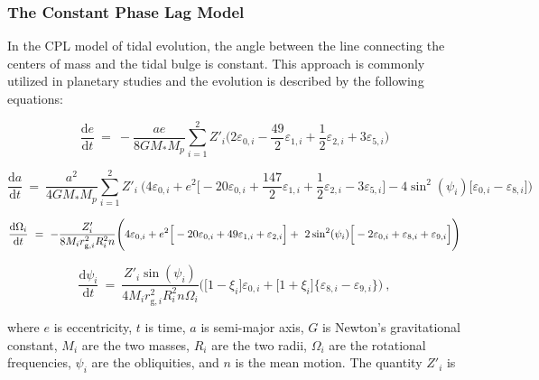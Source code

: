 \documentclass[preprint,12pt]{aastex}
\begin{document}
\subsubsection{The Constant Phase Lag Model}

In the CPL model of tidal evolution, the angle between the line connecting the
centers of mass and the tidal bulge is constant. This approach is commonly
utilized in planetary studies \citep[e.g.][]{GoldreichSoter66,Greenberg09} and the
evolution is described by the following equations:

\begin{equation}\label{eq:e_cpl}
  \frac{\mathrm{d}e}{\mathrm{d}t} \ = \ - \frac{ae}{8 G M_* M_p}
  \sum\limits_{i = 1}^2Z'_i \Bigg(2\varepsilon_{0,i} - \frac{49}{2}\varepsilon_{1,i} + \frac{1}{2}\varepsilon_{2,i} + 3\varepsilon_{5,i}\Bigg)
\end{equation}

\begin{equation}\label{eq:a_cpl}
  \frac{\mathrm{d}a}{\mathrm{d}t} \ = \ \frac{a^2}{4 G M_* M_p}
  \sum\limits_{i = 1}^2 Z'_i  \ {\Bigg(} 4\varepsilon_{0,i} + e^2{\Big [} -20\varepsilon_{0,i} + \frac{1
47}{2}\varepsilon_{1,i} + \nonumber \frac{1}{2}\varepsilon_{2,i} - 3\varepsilon_{5,i} {\Big ]} -4\sin^2(\psi_i){\Big [}\varepsilon_{0,i}-\varepsilon_{8,i}{\Big ]}{\Bigg )} 
\end{equation}

\begin{equation}\label{eq:o_cpl}
  \frac{\mathrm{d}\Omega_i}{\mathrm{d}t} \ = \ - \frac{Z'_i}{8 M_i r_{\mathrm{g},i}
^2 R_i^2 n} {\Bigg (}4\varepsilon_{0,i} + e^2{\Big [} -20\varepsilon_{0,i} + 49\varepsilon_{1,i} + \varepsilon_{2,i} {\Big ]} + \nonumber \ 2\sin^2(\psi_i) {\Big [} -
2\varepsilon_{0,i} + \varepsilon_{8,i} + \varepsilon_{9,i} {\Big ]} {\Bigg )} \\  
\end{equation}

\begin{equation}\label{eq:psi_cpl}
  \frac{\mathrm{d}\psi_i}{\mathrm{d}t} \ = \ \frac{Z'_i \sin(\psi_i)}{4 M_i r_{\mathrm{g},i}^2 R_i^2 n \Omega_i} {\Bigg (} {\Big [} 1-\xi_i {\Big ]}\varepsilon_{0,i} 
+ {\Big [} 1+\xi_i {\Big ]}{\Big \{}\varepsilon_{8,i}-\varepsilon_{9,i}{\Big \}} {\Bigg)} \ ,
\end{equation}

\noindent where $e$ is eccentricity, $t$ is time, $a$ is semi-major axis, $G$ is
Newton's gravitational constant, $M_i$ are the two masses,
$R_i$ are the two radii, $\Omega_i$ are the rotational
frequencies, $\psi_i$ are the obliquities, and $n$ is the mean motion. The
quantity $Z'_i$ is
\end{document}
